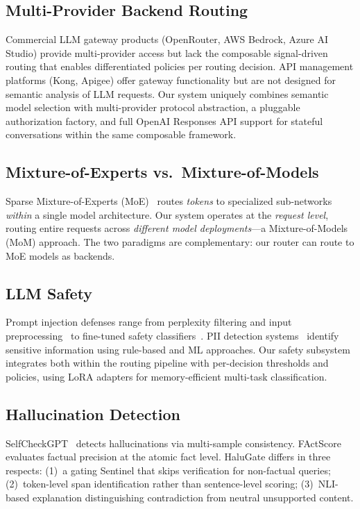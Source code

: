 \subsection{Multi-Provider Backend Routing}

Commercial LLM gateway products (OpenRouter, AWS Bedrock, Azure AI Studio) provide multi-provider access but lack the composable signal-driven routing that enables differentiated policies per routing decision.
API management platforms (Kong, Apigee) offer gateway functionality but are not designed for semantic analysis of LLM requests.
Our system uniquely combines semantic model selection with multi-provider protocol abstraction, a pluggable authorization factory, and full OpenAI Responses API support for stateful conversations within the same composable framework.

\subsection{Mixture-of-Experts vs.\ Mixture-of-Models}

Sparse Mixture-of-Experts (MoE)~\cite{shazeer2017moe,jiang2024mixtral} routes \emph{tokens} to specialized sub-networks \emph{within} a single model architecture.
Our system operates at the \emph{request level}, routing entire requests across \emph{different model deployments}---a Mixture-of-Models (MoM) approach.
The two paradigms are complementary: our router can route to MoE models as backends.

\subsection{LLM Safety}

Prompt injection defenses range from perplexity filtering and input preprocessing~\cite{jain2023baseline} to fine-tuned safety classifiers~\cite{inan2023llamaguard}.
PII detection systems~\cite{lison2021anonymisation} identify sensitive information using rule-based and ML approaches.
Our safety subsystem integrates both within the routing pipeline with per-decision thresholds and policies, using LoRA adapters for memory-efficient multi-task classification.

\subsection{Hallucination Detection}

SelfCheckGPT~\cite{manakul2023selfcheckgpt} detects hallucinations via multi-sample consistency.
FActScore~\cite{min2023factscore} evaluates factual precision at the atomic fact level.
HaluGate differs in three respects:
(1)~a gating Sentinel that skips verification for non-factual queries;
(2)~token-level span identification rather than sentence-level scoring;
(3)~NLI-based explanation distinguishing contradiction from neutral unsupported content.

